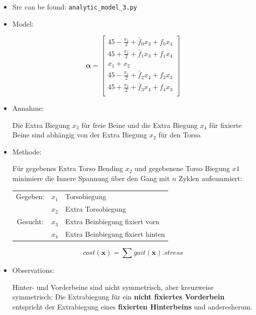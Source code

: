 \documentclass[10pt,a4paper]{article}
\begin{document}
\begin{itemize}

\item Src can be found: \texttt{analytic\_model\_3.py}

\item Model:

\begin{equation}
\bm{\alpha} = \begin{bmatrix}
45 - \frac{x_1}{2} + \bar{f}_0x_3 + f_0x_4 \\
45 + \frac{x_1}{2} + \bar{f}_1x_3 + f_1x_4 \\
x_1 + x_2 \\
45 - \frac{x_1}{2} + \bar{f}_2x_4 + f_3x_3 \\
45 + \frac{x_1}{2} + \bar{f}_3x_4 + f_4x_3 \\
\end{bmatrix}
\end{equation}


\item Annahme:

Die Extra Biegung $x_3$ für freie Beine und die Extra Biegung $x_4$ für fixierte Beine sind abhängig von der Extra Biegung $x_2$ für den Torso.

\item Methode:

Für gegebenes Extra Torso Bending $x_2$ und gegebenene Torso Biegung $x1$ minimiere die Innere Spannung über den Gang mit $n$ Zyklen aufsummiert:

\begin{tabular}{c c l}
Gegeben: 	& $x_1$ & Torsobiegung \\
			& $x_2$	& Extra Torsobiegung \\
Gesucht:	& $x_3$	& Extra Beinbiegung fixiert vorn \\
			& $x_4$	& Extra Beinbiegung fixiert hinten \\

\end{tabular}


\begin{equation}
cost(\bm{x}) = \sum gait(\bm{x}).stress
\end{equation}

\item Observations:

Hinter- und Vorderbeine sind nicht symmetrisch, aber kreuzweise symmetrisch:
Die Extrabiegung für ein \textbf{nicht fixiertes Vorderbein} entspricht der Extrabiegung eines \textbf{fixierten Hinterbeins} und anderesherum.


\end{itemize}
\end{document}

